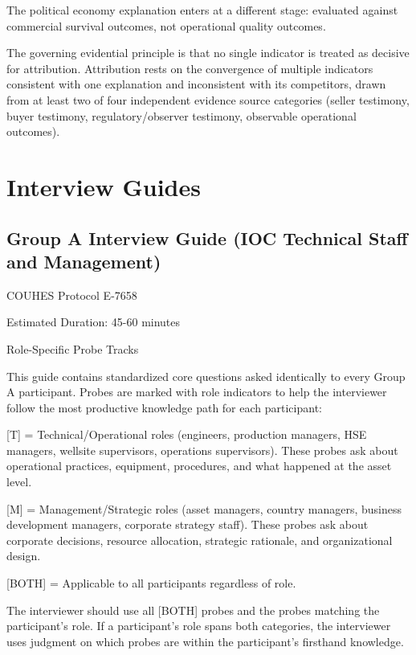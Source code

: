 \documentclass[twoside,fontset=lmodern]{mitthesis}
\begin{document}
The political economy explanation enters at a different stage: evaluated
against commercial survival outcomes, not operational quality outcomes.

The governing evidential principle is that no single indicator is
treated as decisive for attribution. Attribution rests on the
convergence of multiple indicators consistent with one explanation and
inconsistent with its competitors, drawn from at least two of four
independent evidence source categories (seller testimony, buyer
testimony, regulatory/observer testimony, observable operational
outcomes).


\hypertarget{interview-guides}{%
\chapter{Interview Guides}\label{interview-guides}}

\hypertarget{group-a-interview-guide-ioc-technical-staff-and-management}{%
\section{Group A Interview Guide (IOC Technical Staff and
Management)}\label{group-a-interview-guide-ioc-technical-staff-and-management}}

COUHES Protocol E-7658

Estimated Duration: 45-60 minutes

Role-Specific Probe Tracks

This guide contains standardized core questions asked identically to
every Group A participant. Probes are marked with role indicators to
help the interviewer follow the most productive knowledge path for each
participant:

{[}T{]} = Technical/Operational roles (engineers, production managers,
HSE managers, wellsite supervisors, operations supervisors). These
probes ask about operational practices, equipment, procedures, and what
happened at the asset level.

{[}M{]} = Management/Strategic roles (asset managers, country managers,
business development managers, corporate strategy staff). These probes
ask about corporate decisions, resource allocation, strategic rationale,
and organizational design.

{[}BOTH{]} = Applicable to all participants regardless of role.

The interviewer should use all {[}BOTH{]} probes and the probes matching
the participant's role. If a participant's role spans both categories,
the interviewer uses judgment on which probes are within the
participant's firsthand knowledge.
\end{document}
